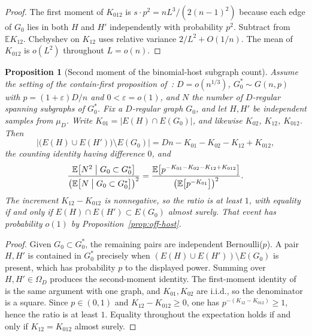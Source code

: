 \documentclass[11pt]{article}
\newtheorem{proposition}[theorem]{Proposition}
\newcommand{\EE}{\mathbb{E}}
\begin{document}
\begin{proof}
The first moment of \(K_{012}\) is \(s\cdot p^2=nL^3/(2(n-1)^2)\) because each
edge of \(G_0\) lies in both \(H\) and \(H'\) independently with probability
\(p^2\).
Subtract from \(\EE K_{12}\).
Chebyshev on \(K_{12}\) uses relative variance \(2/L^2+O(1/n)\).
The mean of \(K_{012}\) is \(o(L^2)\) throughout \(L=o(n)\).
\end{proof}

\begin{proposition}[Second moment of the binomial-host subgraph count]
\label{prop:host-count-second}
Assume the setting of the contain-first proposition of~\cite{PlusOneV1}:
\(D=o(n^{1/3})\), \(G^*_0\sim G(n,p)\) with \(p=(1+\varepsilon)D/n\) and
\(0<\varepsilon=o(1)\), and \(N\) the number of \(D\)-regular spanning subgraphs
of \(G^*_0\).
Fix a \(D\)-regular graph \(G_0\), and let \(H,H'\) be independent samples from
\(\mu_D\).
Write \(K_{01}=\lvert E(H)\cap E(G_0)\rvert\), and likewise \(K_{02}\),
\(K_{12}\), \(K_{012}\).
Then
\[
\bigl\lvert\bigl(E(H)\cup E(H')\bigr)\setminus E(G_0)\bigr\rvert
=
Dn-K_{01}-K_{02}-K_{12}+K_{012},
\]
the counting identity having difference \(0\), and
\[
\frac{\EE\bigl[N^2\bigm|G_0\subset G^*_0\bigr]}
{\bigl(\EE\bigl[N\bigm|G_0\subset G^*_0\bigr]\bigr)^2}
=
\frac{\EE\bigl[p^{-K_{01}-K_{02}-K_{12}+K_{012}}\bigr]}
{\bigl(\EE\bigl[p^{-K_{01}}\bigr]\bigr)^2}.
\]
The increment \(K_{12}-K_{012}\) is nonnegative, so the ratio is at least \(1\),
with equality if and only if \(E(H)\cap E(H')\subset E(G_0)\) almost surely.
That event has probability \(o(1)\) by Proposition~\ref{prop:off-host}.
\end{proposition}

\begin{proof}
Given \(G_0\subset G^*_0\), the remaining pairs are independent Bernoulli(\(p\)).
A pair \(H,H'\) is contained in \(G^*_0\) precisely when
\((E(H)\cup E(H'))\setminus E(G_0)\) is present, which has probability
\(p\) to the displayed power.
Summing over \(H,H'\in\Omega_D\) produces the second-moment identity.
The first-moment identity of~\cite{PlusOneV1} is the same argument with one
graph, and \(K_{01},K_{02}\) are i.i.d., so the denominator is a square.
Since \(p\in(0,1)\) and \(K_{12}-K_{012}\ge 0\), one has
\(p^{-(K_{12}-K_{012})}\ge 1\), hence the ratio is at least \(1\).
Equality throughout the expectation holds if and only if
\(K_{12}=K_{012}\) almost surely.
\end{proof}
\end{document}
